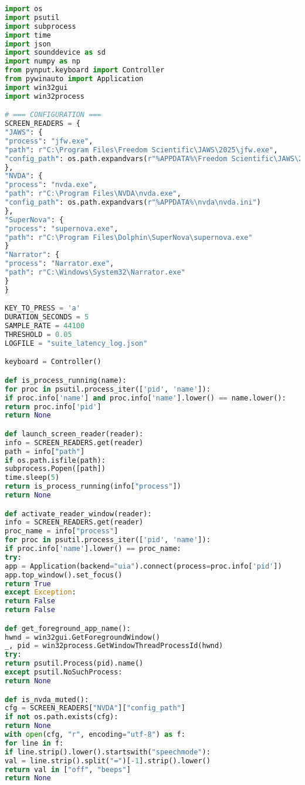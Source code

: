 \begin{lstlisting}[language=python]
import os
import psutil
import subprocess
import time
import json
import sounddevice as sd
import numpy as np
from pynput.keyboard import Controller
from pywinauto import Application
import win32gui
import win32process

# === CONFIGURATION ===
SCREEN_READERS = {
"JAWS": {
"process": "jfw.exe",
"path": r"C:\Program Files\Freedom Scientific\JAWS\2025\jfw.exe",
"config_path": os.path.expandvars(r"%APPDATA%\Freedom Scientific\JAWS\2025\Settings\enu\default.jcf")
},
"NVDA": {
"process": "nvda.exe",
"path": r"C:\Program Files\NVDA\nvda.exe",
"config_path": os.path.expandvars(r"%APPDATA%\nvda\nvda.ini")
},
"SuperNova": {
"process": "supernova.exe",
"path": r"C:\Program Files\Dolphin\SuperNova\supernova.exe"
}
"Narrator": {
"process": "Narrator.exe",
"path": r"C:\Windows\System32\Narrator.exe"
}
}

KEY_TO_PRESS = 'a'
DURATION_SECONDS = 5
SAMPLE_RATE = 44100
THRESHOLD = 0.05
LOGFILE = "suite_latency_log.json"

keyboard = Controller()

def is_process_running(name):
for proc in psutil.process_iter(['pid', 'name']):
if proc.info['name'] and proc.info['name'].lower() == name.lower():
return proc.info['pid']
return None

def launch_screen_reader(reader):
info = SCREEN_READERS.get(reader)
path = info["path"]
if os.path.isfile(path):
subprocess.Popen([path])
time.sleep(5)
return is_process_running(info["process"])
return None

def activate_reader_window(reader):
info = SCREEN_READERS.get(reader)
proc_name = info["process"]
for proc in psutil.process_iter(['pid', 'name']):
if proc.info['name'].lower() == proc_name:
try:
app = Application(backend="uia").connect(process=proc.info['pid'])
app.top_window().set_focus()
return True
except Exception:
return False
return False

def get_foreground_app_name():
hwnd = win32gui.GetForegroundWindow()
_, pid = win32process.GetWindowThreadProcessId(hwnd)
try:
return psutil.Process(pid).name()
except psutil.NoSuchProcess:
return None

def is_nvda_muted():
cfg = SCREEN_READERS["NVDA"]["config_path"]
if not os.path.exists(cfg):
return None
with open(cfg, "r", encoding="utf-8") as f:
for line in f:
if line.strip().lower().startswith("speechmode"):
val = line.strip().split("=")[-1].strip().lower()
return val in ["off", "beeps"]
return None


\end{lstlisting}
